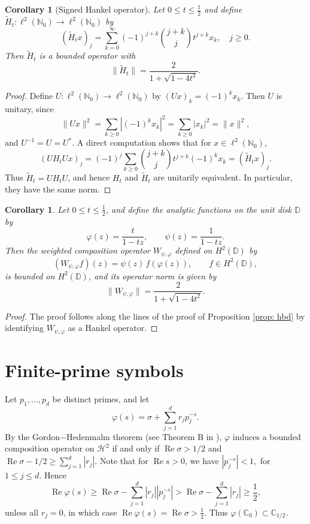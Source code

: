 \documentclass[12pt, reqno]{amsart}
\numberwithin{equation}{section}
\newtheorem{corollary}[theorem]{Corollary}
\begin{document}
\begin{corollary}[Signed Hankel operator]\label{cor:SHO}
Let $0 \le t \le \tfrac{1}{2}$ and define $\widetilde{H}_t : \ell^2(\mathbb{N}_0) \to \ell^2(\mathbb{N}_0)$ by
\[
(\widetilde{H}_t x)_j = \sum_{k=0}^{\infty} (-1)^{j+k} \binom{j+k}{j} t^{j+k} x_k, \quad j \ge 0.
\]
Then $\widetilde{H}_t$ is a bounded operator with
\[
\|\widetilde{H}_t\| = \frac{2}{1+\sqrt{1-4t^2}}.
\]
\end{corollary}
\begin{proof}
Define $U : \ell^2(\mathbb{N}_0) \to \ell^2(\mathbb{N}_0)$ by $(Ux)_k = (-1)^k x_k$. Then $U$ is unitary, since
\[
\|Ux\|^2 = \sum_{k\ge 0} |(-1)^k x_k|^2 = \sum_{k\ge 0} |x_k|^2 = \|x\|^2,
\]
and $U^{-1} = U=U^*$.
A direct computation shows that for $x \in \ell^2(\mathbb{N}_0)$,
\[
(U H_t U x)_j
= (-1)^j \sum_{k\ge 0} \binom{j+k}{j} t^{j+k} (-1)^k x_k
= (\widetilde{H}_t x)_j.
\]
Thus $\widetilde{H}_t = U H_t U$, and hence $H_t$ and $\widetilde{H}_t$ are unitarily equivalent. In particular, they have the same norm.
\end{proof}

 \begin{corollary} \label{cor:NWCO}
Let $0 \le t \leq \tfrac{1}{2}$, and define the analytic functions on the unit disk $\mathbb{D}$ by
\[
\varphi(z) = \frac{t}{1-tz}, \qquad \psi(z) = \frac{1}{1-tz}.
\]
Then the weighted composition operator $W_{\psi,\varphi}$ defined on $H^2(\mathbb{D})$ by
\[
(W_{\psi,\varphi} f)(z) = \psi(z)\, f(\varphi(z)), \qquad f \in H^2(\mathbb{D}),
\]
is bounded on $H^2(\mathbb{D})$, and its operator norm is given by
\[
\|W_{\psi,\varphi}\|
=
\frac{2}{1+\sqrt{1-4t^2}}.
\]
\end{corollary}

\begin{proof}
  The proof follows along the lines of the proof of Proposition \ref{prop: hbd} by identifying
  $W_{\psi,\varphi}$ as a Hankel operator.
\end{proof}


\section{Finite-prime symbols}
\label{sec:3}

Let $p_1,\ldots,p_d$ be distinct primes, and let
\[
\varphi(s)
=
\sigma+\sum_{j=1}^{d}r_jp_j^{-s}.
\]
By the Gordon$-$Hedenmalm theorem (see Theorem B in \cite{GH}), \(\varphi\) induces a bounded composition operator on \(\mathcal{H}^{2}\) if and only if $\operatorname{Re}\sigma>1/2$ and $\operatorname{Re}\sigma-1/2\geq \sum_{j=1}^{d}|r_j|$.
Note that  for $\operatorname{Re}s>0$, we have $|p_j^{-s}|<1,$ for $1\leq j\leq d.$ Hence
\[
\operatorname{Re}\varphi(s)
\geq
\operatorname{Re}\sigma-\sum_{j=1}^{d}|r_j||p_j^{-s}|
>
\operatorname{Re}\sigma-\sum_{j=1}^{d}|r_j|
\geq
\frac{1}{2},
\]
unless all \(r_j=0\), in which case
$\operatorname{Re}\varphi(s)=\operatorname{Re}\sigma>\frac{1}{2}.$
Thus $  \varphi(\mathbb{C}_{0})\subset \mathbb{C}_{1/2}.$
\end{document}
